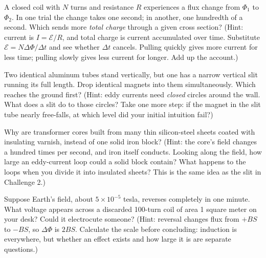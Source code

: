 \begin{puzzles}
\item A closed coil with \(N\) turns and resistance \(R\) experiences a flux change from \(\Phi_1\) to \(\Phi_2\). In one trial the change takes one second; in another, one hundredth of a second. Which sends more \emph{total charge} through a given cross section? (Hint: current is \(I=\mathcal{E}/R\), and total charge is current accumulated over time. Substitute \(\mathcal{E}=N\Delta\Phi/\Delta t\) and see whether \(\Delta t\) cancels. Pulling quickly gives more current for less time; pulling slowly gives less current for longer. Add up the account.)
\item Two identical aluminum tubes stand vertically, but one has a narrow vertical slit running its full length. Drop identical magnets into them simultaneously. Which reaches the ground first? (Hint: eddy currents need \emph{closed} circles around the wall. What does a slit do to those circles? Take one more step: if the magnet in the slit tube nearly free-falls, at which level did your initial intuition fail?)
\item Why are transformer cores built from many thin silicon-steel sheets coated with insulating varnish, instead of one solid iron block? (Hint: the core's field changes a hundred times per second, and iron itself conducts. Looking along the field, how large an eddy-current loop could a solid block contain? What happens to the loops when you divide it into insulated sheets? This is the same idea as the slit in Challenge 2.)
\item Suppose Earth's field, about \(5\times10^{-5}\) tesla, reverses completely in one minute. What voltage appears across a discarded 100-turn coil of area 1 square meter on your desk? Could it electrocute someone? (Hint: reversal changes flux from \(+BS\) to \(-BS\), so \(\Delta\Phi\) is \(2BS\). Calculate the scale before concluding: induction is everywhere, but whether an effect exists and how large it is are separate questions.)
\end{puzzles}
